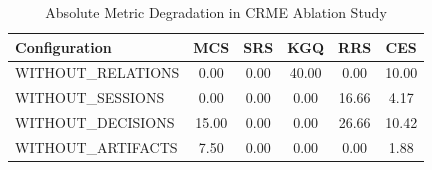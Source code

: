 \begin{table}[htbp]
\centering
\caption{Absolute Metric Degradation in CRME Ablation Study}
\label{tab:crme-ablation-degradation}
\begin{tabular}{lccccc}
\toprule
Configuration & MCS & SRS & KGQ & RRS & CES \\
\midrule
WITHOUT_RELATIONS & 0.00 & 0.00 & 40.00 & 0.00 & 10.00 \\
WITHOUT_SESSIONS & 0.00 & 0.00 & 0.00 & 16.66 & 4.17 \\
WITHOUT_DECISIONS & 15.00 & 0.00 & 0.00 & 26.66 & 10.42 \\
WITHOUT_ARTIFACTS & 7.50 & 0.00 & 0.00 & 0.00 & 1.88 \\
\bottomrule
\end{tabular}
\end{table}
